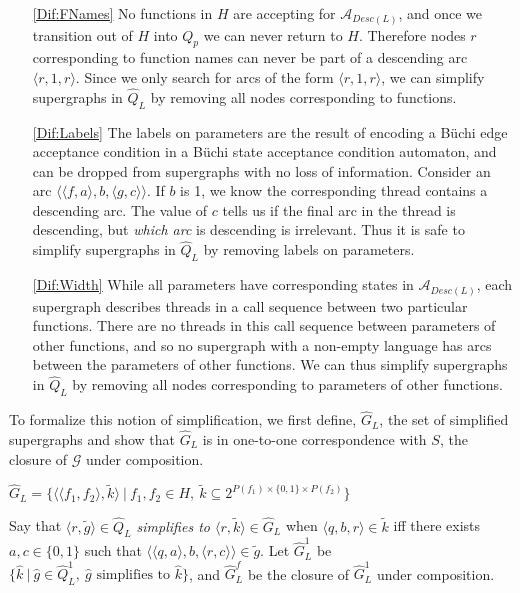 \documentclass{LMCS}
\newcommand{\zug}[1]{\langle #1  \rangle}
\newcommand{\rzug}[1]{{\scriptstyle\langle} #1  {\scriptstyle\rangle}}
\newcommand\buchi{B\"uchi }
\newcommand{\A}{{\mathcal A}}
\newcommand{\G}{{\mathcal G}}
\newcommand{\init}{{1}}
\renewcommand{\graph}{\widetilde}
\newcommand{\superg}{\widehat}
\newcommand{\supergFD}{\superg{Q}_L}
\begin{document}
\begin{enumerate}[(1)]
\item[{\ref{Dif:FNames}}] No functions in $H$ are accepting for $\A_{Desc(L)}$, and
once we transition out of $H$ into $Q_p$ we can never return to $H$. Therefore
nodes $r$ corresponding to function names can never be part of a descending arc
$\zug{r,1,r}$. Since we only search for arcs of the form $\zug{r,1,r}$, we can
simplify supergraphs in $\supergFD$ by removing all nodes corresponding to
functions. 

\item[{\ref{Dif:Labels}}] The labels on parameters are the result of encoding a \buchi
edge acceptance condition in a \buchi state acceptance condition automaton, and
can be dropped from supergraphs with no loss of information.  Consider an arc
$\zug{\zug{f,a}, b, \zug{g,c}}$. If $b$ is 1, we know the corresponding thread
contains a descending arc. The value of $c$ tells us if the final arc in the
thread is descending, but \emph{which arc} is descending is irrelevant.  Thus it is
safe to simplify supergraphs in $\supergFD$ by removing labels on parameters.


\item[{\ref{Dif:Width}}] While all parameters have corresponding states in
$\A_{Desc(L)}$, each supergraph describes threads in a call sequence between two
particular functions.  There are no threads in this call sequence between
parameters of other functions, and so no supergraph with a non-empty language
has arcs between the parameters of other functions. We can thus simplify
supergraphs in $\supergFD$ by removing all nodes corresponding to parameters of
other functions.
\end{enumerate}

To formalize this notion of simplification, we first define, $\superg{G}_L$, the set of
simplified supergraphs and show that $\superg{G}_L$ is in
one-to-one correspondence with $S$, the closure of $\G$ under composition.

\begin{defi}\label{ReducedSgraph}
$\superg{G}_L = \{\zug{\rzug{f_1,f_2}, \graph{k}}~|~f_1,f_2 \in H,~
\graph{k} \subseteq 2^{P(f_1) \times \{0,1\} \times P(f_2)}\}$ 
\end{defi}

Say that \emph{$\zug{r,\graph{g}} \in \supergFD$
simplifies to $\zug{r,\graph{k}} \in \superg{G}_L$} when $\zug{q,b,r} \in
\graph{k}$ iff there exists $a, c \in \{0,1\}$ such that
$\zug{\rzug{q,a},b,\rzug{r,c}} \in \graph{g}$.  Let $\superg{G}_L^{\init}$ be
$\{\superg{k}~|~\superg{g} \in \supergFD^{\init},~
\superg{g} \text{ simplifies to } \superg{k}\}$, and $\superg{G}_L^f$ be the
closure of $\superg{G}_L^{\init}$ under composition. 
\end{document}
